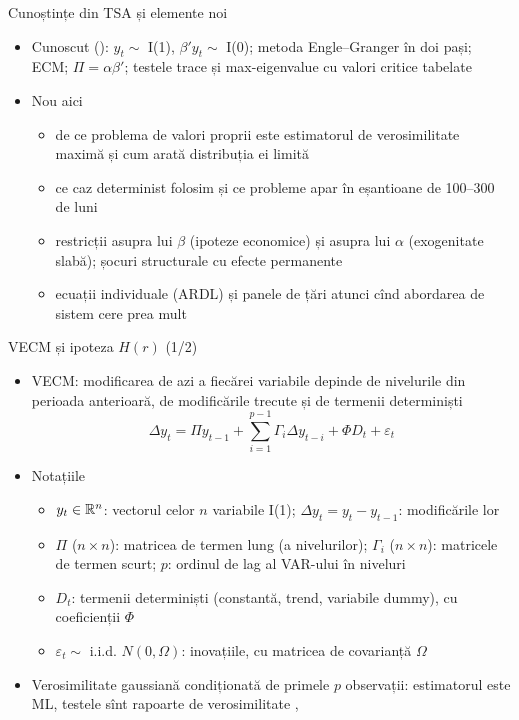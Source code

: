\begin{frame}{Cunoștințe din TSA și elemente noi}
\itemsize{\small}
\begin{itemize}
    \item Cunoscut (): $y_t \sim$ I(1), $\beta'y_t \sim$ I(0); metoda Engle--Granger în doi pași; ECM; $\Pi = \alpha\beta'$; testele trace și max-eigenvalue cu valori critice tabelate
    \item Nou aici
    \begin{itemize}
        \item de ce problema de valori proprii este estimatorul de verosimilitate maximă și cum arată distribuția ei limită
        \item ce caz determinist folosim și ce probleme apar în eșantioane de 100--300 de luni
        \item restricții asupra lui $\beta$ (ipoteze economice) și asupra lui $\alpha$ (exogenitate slabă); șocuri structurale cu efecte permanente
        \item ecuații individuale (ARDL) și panele de țări atunci cînd abordarea de sistem cere prea mult
    \end{itemize}
\end{itemize}
\end{frame}

\begin{frame}{VECM și ipoteza $H(r)$ (1/2)}
\itemsize{\small}
\begin{itemize}
    \item VECM: modificarea de azi a fiecărei variabile depinde de nivelurile din perioada anterioară, de modificările trecute și de termenii determiniști \[ \Delta y_t = \Pi y_{t-1} + \sum_{i=1}^{p-1}\Gamma_i\Delta y_{t-i} + \Phi D_t + \varepsilon_t \]
    \item Notațiile
    \begin{itemize}
        \item $y_t \in \mathbb{R}^n$: vectorul celor $n$ variabile I(1); $\Delta y_t = y_t - y_{t-1}$: modificările lor
        \item $\Pi$ ($n\times n$): matricea de termen lung (a nivelurilor); $\Gamma_i$ ($n\times n$): matricele de termen scurt; $p$: ordinul de lag al VAR-ului în niveluri
        \item $D_t$: termenii determiniști (constantă, trend, variabile dummy), cu coeficienții $\Phi$
        \item $\varepsilon_t \sim$ i.i.d. $N(0, \Omega)$: inovațiile, cu matricea de covarianță $\Omega$
    \end{itemize}
    \item Verosimilitate gaussiană condiționată de primele $p$ observații: estimatorul este ML, testele sînt rapoarte de verosimilitate , 
\end{itemize}
\end{frame}

